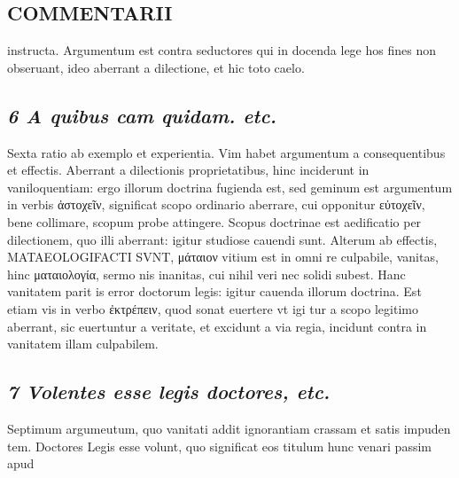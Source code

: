 \documentclass{article}
\begin{document}
\begin{pages}
\section*{COMMENTARII }
\marginpar{[ p.24 ]}\pstart instructa. Argumentum est contra seductores qui in docenda lege hos fines non obseruant, ideo aberrant a dilectione, et hic toto caelo.  \pend
{}
{}
\subsection*{\textit{6 A quibus cam quidam. etc. }}\pstart Sexta ratio ab exemplo et experientia. Vim habet argumentum a consequentibus et effectis. Aberrant a dilectionis proprietatibus, hinc inciderunt in vaniloquentiam: ergo illorum doctrina fugienda est, sed geminum est argumentum in verbis ἀστοχεῖν, significat scopo ordinario aberrare, cui opponitur εὐτοχεῖν, bene collimare, scopum probe attingere. Scopus doctrinae est aedificatio per dilectionem, quo illi aberrant: igitur studiose cauendi sunt. Alterum ab effectis, MATAEOLOGIFACTI SVNT, μάταιον vitium est in omni re culpabile, vanitas, hinc ματαιολογία, sermo nis inanitas, cui nihil veri nec solidi subest. Hanc vanitatem parit is error doctorum legis: igitur cauenda illorum doctrina. Est etiam vis in verbo ἐκτρέπειν, quod sonat euertere vt igi tur a scopo legitimo aberrant, sic euertuntur a veritate, et excidunt a via regia, incidunt contra in vanitatem illam culpabilem.  \pend
{}
{}
\subsection*{\textit{7 Volentes esse legis doctores, etc. }}\pstart Septimum argumeutum, quo vanitati addit ignorantiam crassam et satis impuden tem. Doctores Legis esse volunt, quo significat eos titulum hunc venari passim apud  \pend

\end{pages}
\end{document}

